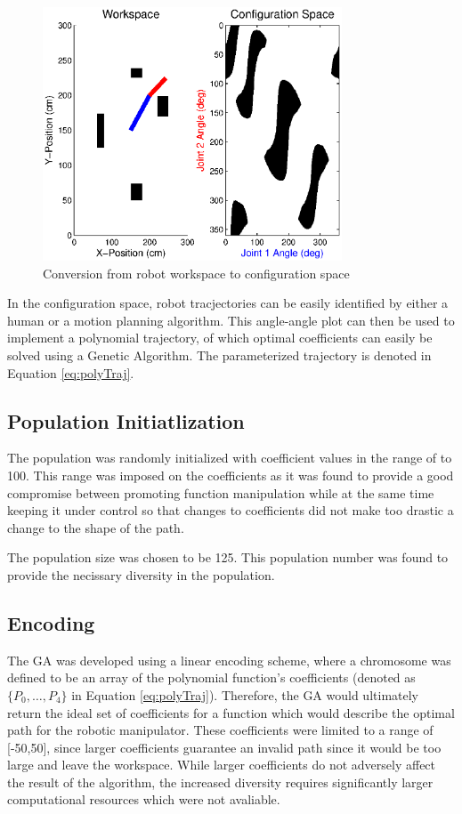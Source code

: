 \begin{figure}[h]
	\centering
	\includegraphics[width=3.5in]{./figures/wp2cs.eps}
	\caption{Conversion from robot workspace to configuration space }
	\label{fig:ws2cs}
\end{figure}

In the configuration space, robot tracjectories can be easily identified by either a human or a motion planning algorithm. This angle-angle plot can then be used to implement a polynomial trajectory, of which optimal coefficients can easily be solved using a Genetic Algorithm. The parameterized trajectory is denoted in Equation \ref{eq:polyTraj}.

\subsection{Population Initiatlization}
The population was randomly initialized with coefficient values in the range of  to 100. This range was imposed on the coefficients as it was found to provide a good compromise between promoting function manipulation while at the same time keeping it under control so that changes to coefficients did not make too drastic a change to the shape of the path.

The population size was chosen to be 125. This population number was found to provide the necissary diversity in the population.

\subsection{Encoding}
The GA was developed using a linear encoding scheme, where a chromosome was defined to be an array of the polynomial function's coefficients (denoted as $\{P_0, \ldots, P_4\}$ in Equation \ref{eq:polyTraj}). Therefore, the GA would ultimately return the ideal set of coefficients for a function which would describe the optimal path for the robotic manipulator. These coefficients were limited to a range of [-50,50], since larger coefficients guarantee an invalid path since it would be too large and leave the workspace. While larger coefficients do not adversely affect the result of the algorithm, the increased diversity requires significantly larger computational resources which were not avaliable.

